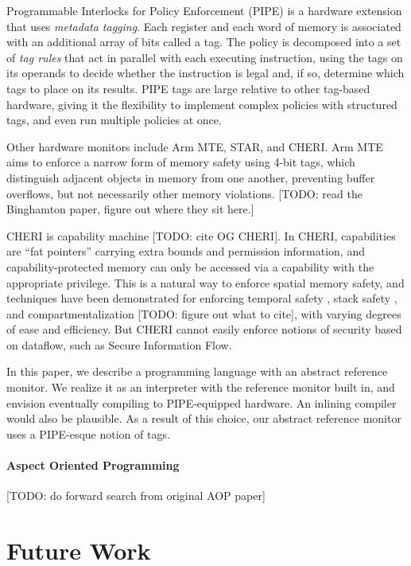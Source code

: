 \documentclass{llncs}
\begin{document}
\begin{table}[t]
Programmable Interlocks for Policy Enforcement (PIPE) \cite{Dhawan14:PUMP} is a hardware extension
that uses {\em metadata tagging}. Each register and each word of memory is associated with
an additional array of bits called a tag. The policy is decomposed into a set of {\em tag rules}
that act in parallel with each executing instruction, using the tags on its operands to
decide whether the instruction is legal and, if so, determine which tags to place on its results.
PIPE tags are large relative to other tag-based hardware, giving it the flexibility
to implement complex policies with structured tags, and even run multiple policies at once.

Other hardware monitors include Arm MTE, STAR, and CHERI.
Arm MTE aims to enforce a narrow form of memory safety using 4-bit tags, which distinguish adjacent objects
in memory from one another, preventing buffer overflows, but not necessarily other memory violations.
[TODO: read the Binghamton paper, figure out where they sit here.] 

CHERI is capability machine [TODO: cite OG CHERI]. In CHERI, capabilities
are ``fat pointers'' carrying extra bounds and permission information, and capability-protected
memory can only be accessed via a capability with the appropriate privilege. This is a natural
way to enforce spatial memory safety, and techniques have been demonstrated for enforcing
temporal safety \cite{NWF20:Cornucopia}, stack safety \cite{Skorstengaard19:stktokens},
and compartmentalization [TODO: figure out what to cite], with varying degrees of ease and
efficiency. But CHERI cannot easily enforce notions of security based on dataflow,
such as Secure Information Flow.

In this paper, we describe a programming language with an abstract reference monitor.
We realize it as an interpreter with the reference monitor built in, and envision
eventually compiling to PIPE-equipped hardware. An inlining compiler would also be plausible.
As a result of this choice, our abstract reference monitor uses a PIPE-esque notion of
tags.

\paragraph{Aspect Oriented Programming}

[TODO: do forward search from original AOP paper]

\section{Future Work}
\label{sec:futurework}


\end{table}
\end{document}
